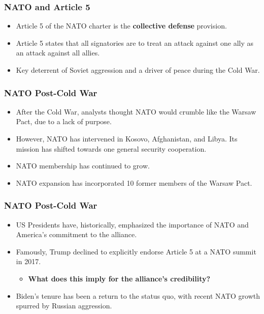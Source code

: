 \documentclass[handout]{beamer}
\begin{document}
\begin{frame} 
\frametitle{\LARGE{NATO and Article 5}}
	\begin{itemize}
		\item Article 5 of the NATO charter is the \textbf{collective defense} provision. \pause
		\item Article 5 states that all signatories are to treat an attack against one ally as an attack against all allies. \pause 
		\item Key deterrent of Soviet aggression and a driver of peace during the Cold War.
	\end{itemize}
\end{frame}

\begin{frame} 
\frametitle{\LARGE{NATO Post-Cold War}}
	\begin{itemize}
		\item After the Cold War, analysts thought NATO would crumble like the Warsaw Pact, due to a lack of purpose. \pause 
		\item However, NATO has intervened in Kosovo, Afghanistan, and Libya. Its mission has shifted towards one general security cooperation. \pause
		\item NATO membership has continued to grow. \pause
		\item NATO expansion has incorporated 10 former members of the Warsaw Pact. \pause
	\end{itemize}
\end{frame}

\begin{frame} 
	\frametitle{\LARGE{NATO Post-Cold War}}
	\begin{itemize}
		\item US Presidents have, historically, emphasized the importance of NATO and America's commitment to the alliance. \pause
		\item Famously, Trump declined to explicitly endorse Article 5 at a NATO summit in 2017. \pause
		\begin{itemize}
			\item \textbf{What does this imply for the alliance's credibility?} \pause
		\end{itemize}
		\item Biden's tenure has been a return to the status quo, with recent NATO growth spurred by Russian aggression.
	\end{itemize}
\end{frame}
	
\end{document}
